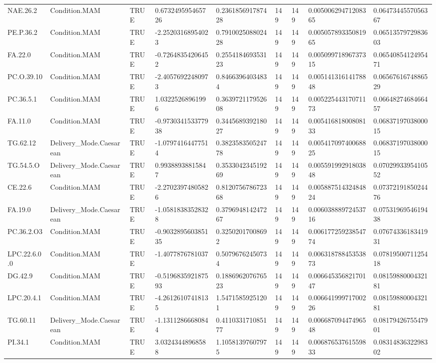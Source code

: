 \begin{longtable}{lllllllll}
NAE.26.2 & Condition.MAM & TRUE & 0.673249595465726 & 0.236185691787428 & 149 & 149 & 0.00500629471208365 & 0.0647344557056367 \\
PE.P.36.2 & Condition.MAM & TRUE & -2.25203168954023 & 0.791002508802428 & 149 & 149 & 0.00505789335081965 & 0.0651357972983603 \\
FA.22.0 & Condition.MAM & TRUE & -0.72648354206452 & 0.255418469353123 & 149 & 149 & 0.00509971896737315 & 0.0654085412495471 \\
PC.O.39.10 & Condition.MAM & TRUE & -2.40576922480973 & 0.84663964034834 & 149 & 149 & 0.00514131614178848 & 0.0656761674886529 \\
PC.36.5.1 & Condition.MAM & TRUE & 1.03225268961996 & 0.363972117952608 & 149 & 149 & 0.00522544317071173 & 0.0664827468466457 \\
FA.11.0 & Condition.MAM & TRUE & -0.973034153377938 & 0.344568939218027 & 149 & 149 & 0.00541681800808133 & 0.0683719703800015 \\
TG.62.12 & Delivery\_Mode.Caesarean & TRUE & -1.07974164477514 & 0.382358350524778 & 149 & 149 & 0.00541709740068825 & 0.0683719703800015 \\
TG.54.5.O & Delivery\_Mode.Caesarean & TRUE & 0.99388938815847 & 0.353304234519269 & 149 & 149 & 0.00559199291803848 & 0.0702993395410552 \\
CE.22.6 & Condition.MAM & TRUE & -2.27023974805826 & 0.812075678672368 & 149 & 149 & 0.00588751432484824 & 0.0737219185024476 \\
FA.19.0 & Delivery\_Mode.Caesarean & TRUE & -1.05818383528328 & 0.379694814247267 & 149 & 149 & 0.00603888972453716 & 0.0753196954619438 \\
PC.36.2.O3 & Condition.MAM & TRUE & -0.903289560385135 & 0.32502017008692 & 149 & 149 & 0.00617725923854774 & 0.0767433618341931 \\
LPC.22.6.0.0 & Condition.MAM & TRUE & -1.4077876781037 & 0.50796762450734 & 149 & 149 & 0.00631878845353873 & 0.0781950071125418 \\
DG.42.9 & Condition.MAM & TRUE & -0.519683592187593 & 0.188696207676523 & 149 & 149 & 0.00664535682170147 & 0.0815988000432181 \\
LPC.20.4.1 & Condition.MAM & TRUE & -4.26126107418135 & 1.54715859251201 & 149 & 149 & 0.00664199971700226 & 0.0815988000432181 \\
TG.60.11 & Delivery\_Mode.Caesarean & TRUE & -1.13112866680844 & 0.411033171085177 & 149 & 149 & 0.00668709447496548 & 0.0817942675547901 \\
PI.34.1 & Condition.MAM & TRUE & 3.03243448968588 & 1.10581397607975 & 149 & 149 & 0.00687653761559833 & 0.0831483632298302 \\

\end{longtable}

